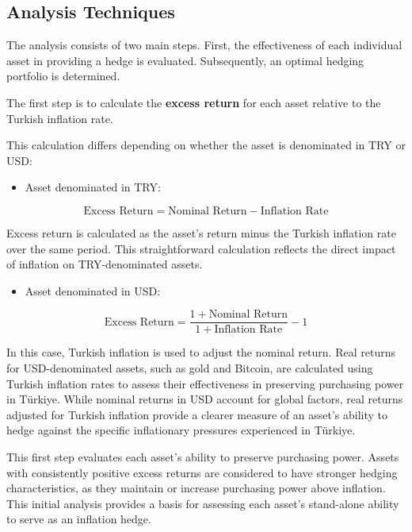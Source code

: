 \documentclass[
]{article}
\providecommand{\tightlist}{%
  \setlength{\itemsep}{0pt}\setlength{\parskip}{0pt}}
\begin{document}
\subsection{Analysis Techniques}\label{analysis-techniques}

The analysis consists of two main steps. First, the effectiveness of
each individual asset in providing a hedge is evaluated. Subsequently,
an optimal hedging portfolio is determined.

The first step is to calculate the \textbf{excess return} for each asset
relative to the Turkish inflation rate.

This calculation differs depending on whether the asset is denominated
in TRY or USD:

\begin{itemize}
\tightlist
\item
  Asset denominated in TRY:
\end{itemize}

\[
\text{Excess Return}= \text{Nominal Return} - \text{Inflation Rate}
\]

Excess return is calculated as the asset's return minus the Turkish
inflation rate over the same period. This straightforward calculation
reflects the direct impact of inflation on TRY-denominated assets.

\begin{itemize}
\tightlist
\item
  Asset denominated in USD:
\end{itemize}

\[
\text{Excess Return} = \frac{1 + \text{Nominal Return}}{1 + \text{Inflation Rate}} - 1
\]

In this case, Turkish inflation is used to adjust the nominal return.
Real returns for USD-denominated assets, such as gold and Bitcoin, are
calculated using Turkish inflation rates to assess their effectiveness
in preserving purchasing power in Türkiye. While nominal returns in USD
account for global factors, real returns adjusted for Turkish inflation
provide a clearer measure of an asset's ability to hedge against the
specific inflationary pressures experienced in Türkiye.

This first step evaluates each asset's ability to preserve purchasing
power. Assets with consistently positive excess returns are considered
to have stronger hedging characteristics, as they maintain or increase
purchasing power above inflation. This initial analysis provides a basis
for assessing each asset's stand-alone ability to serve as an inflation
hedge.
\end{document}

